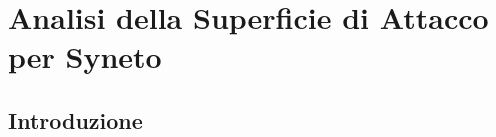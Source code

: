\begin{center}
\vspace{0cm}
\vspace{0cm}
\end{center}
\chapter{Analisi della Superficie di Attacco per Syneto}

\section{Introduzione}


